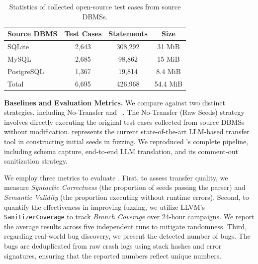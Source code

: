 \documentclass[sigconf,review,anonymous]{acmart}
\begin{document}
\begin{table}[t]
\centering
\caption{Statistics of collected open-source test cases from source DBMSs.}
\label{tab:collected_seeds}
\small
\setlength{\tabcolsep}{5pt}
\begin{tabular}{lccc}
    \toprule
    Source DBMS & Test Cases & Statements & Size \\
    \midrule
    SQLite & 2,643 & 308,292 & 31 MiB \\
    MySQL & 2,685 & 98,862 & 15 MiB \\
    PostgreSQL & 1,367 & 19,814 & 8.4 MiB \\
    \midrule
    Total & 6,695 & 426,968 & 54.4 MiB \\
    \bottomrule
\end{tabular}
\end{table}

\textbf{Baselines and Evaluation Metrics.}
We compare \tool{} against two distinct strategies, including No-Transfer and \sedar{}~\cite{fu2024sedar}. 
The No-Transfer (Raw Seeds) strategy involves directly executing the original test cases collected from source DBMSs without modification. 
\sedar{} represents the current state-of-the-art LLM-based transfer tool in constructing initial seeds in fuzzing. 
We reproduced \sedar{}'s complete pipeline, including schema capture, end-to-end LLM translation, and its comment-out sanitization strategy.

We employ three metrics to evaluate \tool{}.
First, to assess transfer quality, we measure \textit{Syntactic Correctness} (the proportion of seeds passing the parser) and \textit{Semantic Validity} (the proportion executing without runtime errors). 
Second, to quantify the effectiveness in improving fuzzing, we utilize LLVM's \texttt{SanitizerCoverage} to track \textit{Branch Coverage} over 24-hour campaigns. We report the average results across five independent runs to mitigate randomness. Third, regarding real-world bug discovery, we present the detected number of bugs. 
The bugs are deduplicated from raw crash logs using stack hashes and error signatures, ensuring that the reported numbers reflect unique numbers.

\end{document}
